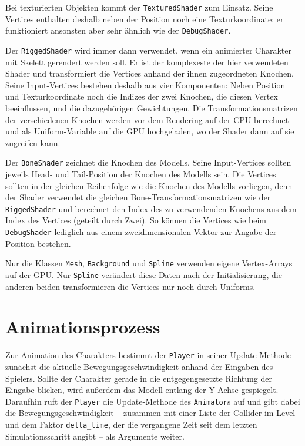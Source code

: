 Bei texturierten Objekten kommt der \lstinline{TexturedShader} zum Einsatz. Seine Vertices enthalten deshalb neben der Position noch eine Texturkoordinate; er funktioniert ansonsten aber sehr ähnlich wie der \lstinline{DebugShader}.

Der \lstinline{RiggedShader} wird immer dann verwendet, wenn ein animierter Charakter mit Skelett gerendert werden soll. Er ist der komplexeste der hier verwendeten Shader und transformiert die Vertices anhand der ihnen zugeordneten Knochen. Seine Input-Vertices bestehen deshalb aus vier Komponenten: Neben Position und Texturkoordinate noch die Indizes der zwei Knochen, die diesen Vertex beeinflussen, und die dazugehörigen Gewichtungen. Die Transformationsmatrizen der verschiedenen Knochen werden vor dem Rendering auf der CPU berechnet und als Uniform-Variable auf die GPU hochgeladen, wo der Shader dann auf sie zugreifen kann.

Der \lstinline{BoneShader} zeichnet die Knochen des Modells. Seine Input-Vertices sollten jeweils Head- und Tail-Position der Knochen des Modells sein. Die Vertices sollten in der gleichen Reihenfolge wie die Knochen des Modells vorliegen, denn der Shader verwendet die gleichen Bone-Transformationsmatrizen wie der \lstinline{RiggedShader} und berechnet den Index des zu verwendenden Knochens aus dem Index des Vertices (geteilt durch Zwei). So können die Vertices wie beim \lstinline{DebugShader} lediglich aus einem zweidimensionalen Vektor zur Angabe der Position bestehen.

Nur die Klassen \lstinline{Mesh}, \lstinline{Background} und \lstinline{Spline} verwenden eigene Vertex-Arrays auf der GPU. Nur \lstinline{Spline} verändert diese Daten nach der Initialisierung, die anderen beiden transformieren die Vertices nur noch durch Uniforms.

\section{Animationsprozess} \label{animator_section}
Zur Animation des Charakters bestimmt der \lstinline{Player} in seiner Update-Methode zunächst die aktuelle Bewegungsgeschwindigkeit anhand der Eingaben des Spielers. Sollte der Charakter gerade in die entgegengesetzte Richtung der Eingabe blicken, wird außerdem das Modell entlang der Y-Achse gespiegelt. Daraufhin ruft der \lstinline{Player} die Update-Methode des \lstinline{Animator}s auf und gibt dabei die Bewegungsgeschwindigkeit -- zusammen mit einer Liste der Collider im Level und dem Faktor \lstinline{delta_time}, der die vergangene Zeit seit dem letzten Simulationsschritt angibt -- als Argumente weiter.

